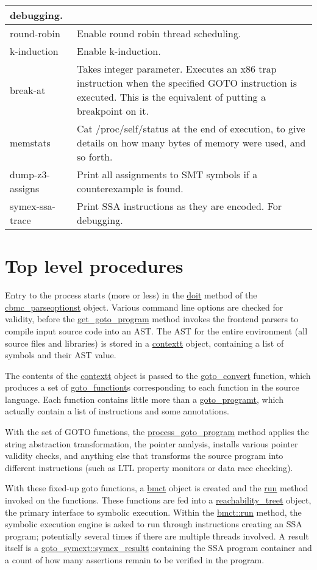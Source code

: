 \documentclass{article}
\begin{document}
\begin{table*}[ht]
\begin{tabularx}{\linewidth}{|l|X|}
debugging.\\
\hline
round-robin & Enable round robin thread scheduling.\\
\hline
k-induction & Enable k-induction.\\
\hline
break-at & Takes integer parameter. Executes an x86 trap instruction when the
specified GOTO instruction is executed. This is the equivalent of putting a
breakpoint on it.\\
\hline
memstats & Cat /proc/self/status at the end of execution, to give details on
how many bytes of memory were used, and so forth.\\
\hline
dump-z3-assigns & Print all assignments to SMT symbols if a counterexample
is found.\\
\hline
symex-ssa-trace & Print SSA instructions as they are encoded. For debugging.\\
\hline
\end{tabularx}
\end{table*}

\section{Top level procedures}

Entry to the process starts (more or less) in the \url{doit} method of the
\url{cbmc_parseoptionst} object. Various command line options are checked
for validity, before the \url{get_goto_program} method invokes the
frontend parsers to compile input source code into an AST. The AST for the
entire environment (all source files and libraries) is stored in a
\url{contextt} object, containing a list of symbols and their AST value.

The contents of the \url{contextt} object is passed to the
\url{goto_convert} function, which produces a set of
\url{goto_functiont}s corresponding to each function in the source language.
Each function contains little more than a \url{goto_programt}, which
actually contain a list of instructions and some annotations.

With the set of GOTO functions, the \url{process_goto_program} method
applies the string abstraction transformation, the pointer analysis,
installs various pointer validity checks, and anything else that transforms
the source program into different instructions (such as LTL property monitors
or data race checking).

With these fixed-up goto functions, a \url{bmct} object is created and the
\url{run} method invoked on the functions. These functions are fed into a
\url{reachability_treet} object, the primary interface to symbolic
execution. Within the \url{bmct::run} method, the symbolic execution engine
is asked to run through instructions creating an SSA program; potentially
several times if there are multiple threads involved. A result itself is a
\url{goto_symext::symex_resultt} containing the SSA program container and
a count of how many assertions remain to be verified in the program.
\end{document}
